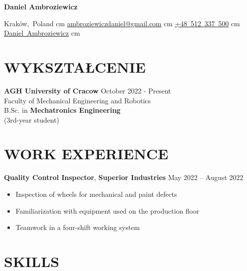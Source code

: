 \documentclass[a4paper,10pt]{extarticle}
\begin{document}
\pagestyle{empty}

\begin{center}
\fontsize{26 pt}{26 pt}\selectfont
\textbf{Daniel Ambroziewicz}

\vspace{0.3 cm}

\normalsize
\mbox{{\footnotesize\faMapMarker*}\hspace*{0.13cm}Kraków, Poland}%
 cm%
\mbox{\href{mailto:ambroziewiczdaniel@gmail.com}{{\footnotesize\faEnvelope[regular]}\hspace*{0.13cm}ambroziewiczdaniel@gmail.com}}%
 cm%
\mbox{\href{tel:+48-512-337-500}{{\footnotesize\faPhone*}\hspace*{0.13cm}+48 512 337 500}}%
 cm%
\mbox{\href{https://www.linkedin.com/in/daniel-ambroziewicz-9343a414a/}{{\footnotesize\faLinkedinIn}\hspace*{0.13cm}Daniel Ambroziewicz}}%
 cm%
\end{center}

\section*{WYKSZTAŁCENIE}
\noindent
\textbf{AGH University of Cracow} \hfill October 2022 - Present \\
Faculty of Mechanical Engineering and Robotics \\
B.Sc. in \textbf{Mechatronics Engineering}\\
(3rd-year student)

\section*{WORK EXPERIENCE}

\noindent
\textbf{Quality Control Inspector}, \textbf{Superior Industries} \hfill May 2022 – August 2022
\begin{itemize}
\item Inspection of wheels for mechanical and paint defects
\item Familiarization with equipment used on the production floor
\item Teamwork in a four-shift working system
\end{itemize}

\section*{SKILLS}
\end{document}
